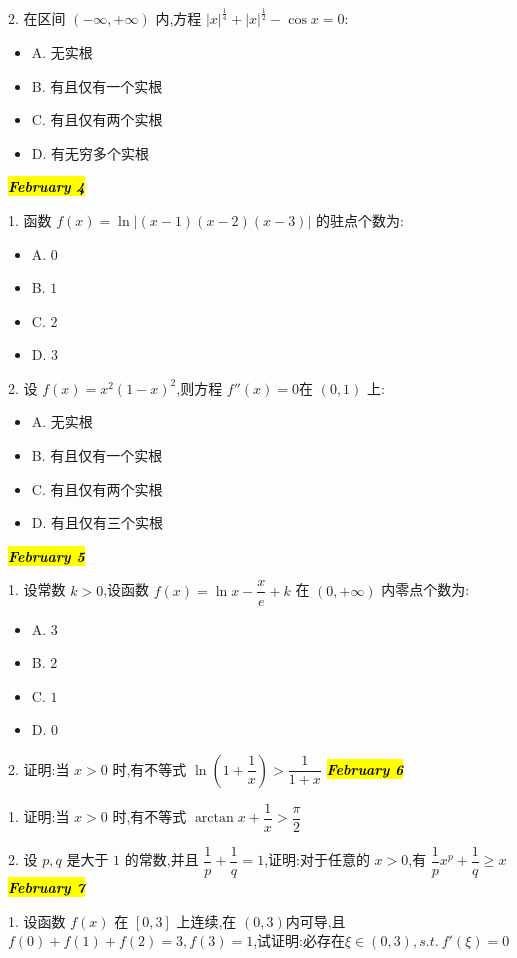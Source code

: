 2. 在区间 $(-\infty,+\infty)$ 内,方程 $|x|^{\frac{1}{4}}+|x|^{\frac{1}{2}}-\cos x=0$: 
\begin{itemize}
	\item A. 无实根
	\item B. 有且仅有一个实根
	\item C. 有且仅有两个实根
	\item D. 有无穷多个实根
\end{itemize}
\hl{\textbf{\textit{February 4}}}

1. 函数 $f(x)=\ln|(x-1)(x-2)(x-3)|$ 的驻点个数为:
\begin{itemize}
	\item A. $0$
	\item B. $1$
	\item C. $2$
	\item D. $3$
\end{itemize}

2. 设 $f(x)=x^{2}(1-x)^{2}$,则方程 $f''(x)=0$在 $(0,1)$ 上:
\begin{itemize}
	\item A. 无实根
	\item B. 有且仅有一个实根
	\item C. 有且仅有两个实根
	\item D. 有且仅有三个实根
\end{itemize}
\hl{\textbf{\textit{February 5}}}

1. 设常数 $k>0$,设函数 $f(x)=\ln x-\dfrac{x}{e}+k$ 在 $(0,+\infty)$ 内零点个数为:
\begin{itemize}
	\item A. $3$
	\item B. $2$
	\item C. $1$
	\item D. $0$
\end{itemize}

2. 证明:当 $x>0$ 时,有不等式 $\ln(1+\dfrac{1}{x})>\dfrac{1}{1+x}$
\hl{\textbf{\textit{February 6}}}

1. 证明:当 $x>0$ 时,有不等式 $\arctan x+\dfrac{1}{x}>\dfrac{\pi}{2}$

2. 设 $p,q$ 是大于 $1$ 的常数,并且 $\dfrac{1}{p}+\dfrac{1}{q}=1$,证明:对于任意的 $x>0$,有 $\dfrac{1}{p}x^{p}+\dfrac{1}{q}\geq x$
\hl{\textbf{\textit{February 7}}}

1. 设函数 $f(x)$ 在 $[0,3]$ 上连续,在 $(0,3)$内可导,且 $f(0)+f(1)+f(2)=3,f(3)=1$,试证明:必存在$\xi\in(0,3),s.t.\ f'(\xi)=0$

